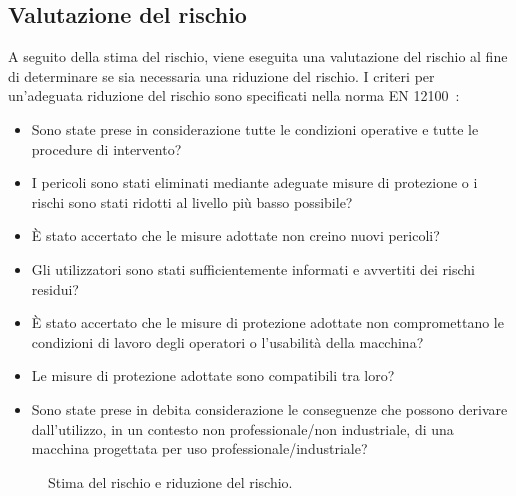 \subsection{Valutazione del rischio}
\label{subsec:05-2-2}
A seguito della stima del rischio, viene eseguita una valutazione del rischio al fine di determinare se sia necessaria una riduzione del rischio. I criteri per un'adeguata riduzione del rischio sono specificati nella norma EN 12100~\cite{eniso12100}:
\begin{itemize}
    \item Sono state prese in considerazione tutte le condizioni operative e tutte le procedure di intervento?
    \item I pericoli sono stati eliminati mediante adeguate misure di protezione o i rischi sono stati ridotti al livello più basso possibile?
    \item È stato accertato che le misure adottate non creino nuovi pericoli?
    \item Gli utilizzatori sono stati sufficientemente informati e avvertiti dei rischi residui?
    \item È stato accertato che le misure di protezione adottate non compromettano le condizioni di lavoro degli operatori o l'usabilità della macchina?
    \item Le misure di protezione adottate sono compatibili tra loro?
    \item Sono state prese in debita considerazione le conseguenze che possono derivare dall'utilizzo, in un contesto non professionale/non industriale, di una macchina progettata per uso professionale/industriale?
\end{itemize}

\begin{figure}[htbp]
    \centering
    \resizebox{\textwidth}{!}{}
    \caption{Stima del rischio e riduzione del rischio.}
    \label{fig:05-03}
\end{figure}

